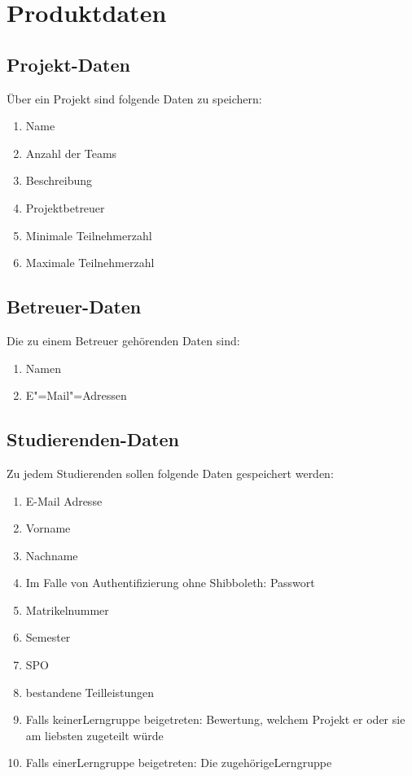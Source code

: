 \documentclass[parskip=full]{scrartcl}
\newcommand{\swtLabel}[1]{\textbf{/#1\arabic*0/}}
\begin{document}
\section{Produktdaten}

\subsection{Projekt-Daten} 
Über ein Projekt sind folgende Daten zu speichern:
\begin{enumerate}[label=\swtLabel{D}] 
  \item Name
  \item Anzahl der Teams
  \item Beschreibung
  \item Projektbetreuer
  \item Minimale Teilnehmerzahl
  \item Maximale Teilnehmerzahl
\end{enumerate}
\subsection{Betreuer-Daten}
Die zu einem Betreuer gehörenden Daten sind:
\begin{enumerate}[label=\swtLabel{D}, resume] 
	\item Namen 
	\item E"=Mail"=Adressen
\end{enumerate}
\subsection{Studierenden-Daten} 
Zu jedem Studierenden sollen folgende Daten gespeichert werden:
\begin{enumerate}[label=\swtLabel{D}, resume] 
  \item E-Mail Adresse \label{SDatenAnfang}
  \item Vorname
  \item Nachname
  \item Im Falle von Authentifizierung ohne Shibboleth: Passwort
  \item Matrikelnummer
  \item Semester
  \item SPO
  \item bestandene Teilleistungen \label{SDatenEnde}
  \item Falls keiner\gls{Lerngruppe} beigetreten: Bewertung, welchem Projekt er oder
  sie am liebsten zugeteilt würde
  \item Falls einer\gls{Lerngruppe} beigetreten: Die zugehörige\gls{Lerngruppe}
\end{enumerate}
\end{document}

